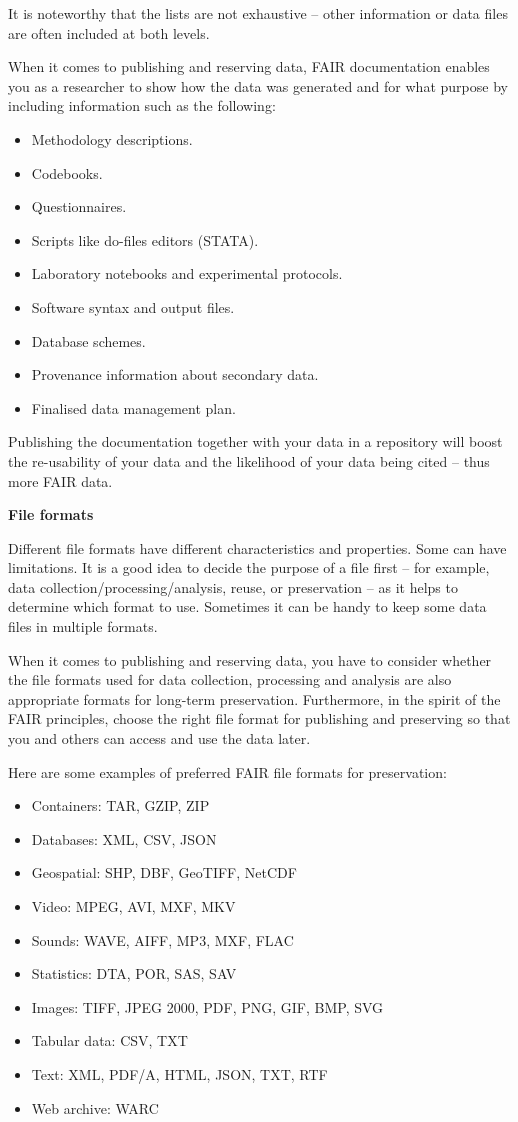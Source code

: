 \documentclass[
]{book}
\begin{document}
It is noteworthy that the lists are not exhaustive -- other information or data files are often included at both levels.

When it comes to publishing and reserving data, FAIR documentation enables you as a researcher to show how the data was generated and for what purpose by including information such as the following:

\begin{itemize}
\item
  Methodology descriptions.
\item
  Codebooks.
\item
  Questionnaires.
\item
  Scripts like do-files editors (STATA).
\item
  Laboratory notebooks and experimental protocols.
\item
  Software syntax and output files.
\item
  Database schemes.
\item
  Provenance information about secondary data.
\item
  Finalised data management plan.
\end{itemize}

Publishing the documentation together with your data in a repository will boost the re-usability of your data and the likelihood of your data being cited -- thus more FAIR data.

\textbf{File formats}

Different file formats have different characteristics and properties. Some can have limitations. It is a good idea to decide the purpose of a file first -- for example, data collection/processing/analysis, reuse, or preservation -- as it helps to determine which format to use. Sometimes it can be handy to keep some data files in multiple formats.

When it comes to publishing and reserving data, you have to consider whether the file formats used for data collection, processing and analysis are also appropriate formats for long-term preservation. Furthermore, in the spirit of the FAIR principles, choose the right file format for publishing and preserving so that you and others can access and use the data later.

Here are some examples of preferred FAIR file formats for preservation:

\begin{itemize}
\item
  Containers: TAR, GZIP, ZIP
\item
  Databases: XML, CSV, JSON
\item
  Geospatial: SHP, DBF, GeoTIFF, NetCDF
\item
  Video: MPEG, AVI, MXF, MKV
\item
  Sounds: WAVE, AIFF, MP3, MXF, FLAC
\item
  Statistics: DTA, POR, SAS, SAV
\item
  Images: TIFF, JPEG 2000, PDF, PNG, GIF, BMP, SVG
\item
  Tabular data: CSV, TXT
\item
  Text: XML, PDF/A, HTML, JSON, TXT, RTF
\item
  Web archive: WARC
\end{itemize}
\end{document}
